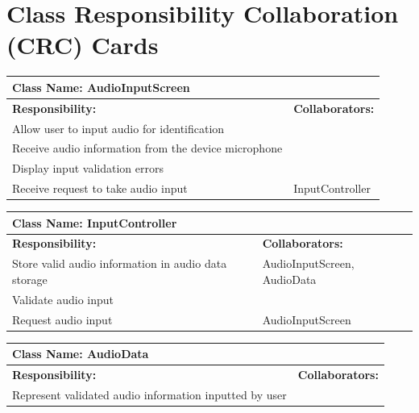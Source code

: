 \documentclass[]{article}
\begin{document}

\newpage	
\section{Class Responsibility Collaboration (CRC) Cards}
\label{sec:class_responsibility_collaboration_crc_cards}

	
	\begin{table}[ht]
		\centering
		\begin{tabular}{|p{5cm}|p{5cm}|}
		\hline 
		 \multicolumn{2}{|l|}{\textbf{Class Name: AudioInputScreen}} \\
		\hline
		\textbf{Responsibility:} & \textbf{Collaborators:} \\
		\hline
		Allow user to input audio for identification &  \\
		\hline
		Receive audio information from the device microphone &  \\
		\hline
		Display input validation errors &  \\
		\hline
		Receive request to take audio input & InputController \\
		\hline
		\end{tabular}
	\end{table}
	
	\begin{table}[ht]
		\centering
		\begin{tabular}{|p{5cm}|p{5cm}|}
		\hline 
		 \multicolumn{2}{|l|}{\textbf{Class Name: InputController}} \\
		\hline
		\textbf{Responsibility:} & \textbf{Collaborators:} \\
		\hline
		Store valid audio information in audio data storage & AudioInputScreen, AudioData \\
		\hline
		Validate audio input &  \\
		\hline
		Request audio input & AudioInputScreen \\
		\hline
		\end{tabular}
	\end{table}
	
	\begin{table}[ht]
		\centering
		\begin{tabular}{|p{5cm}|p{5cm}|}
		\hline 
		 \multicolumn{2}{|l|}{\textbf{Class Name: AudioData}} \\
		\hline
		\textbf{Responsibility:} & \textbf{Collaborators:} \\
		\hline
		Represent validated audio information inputted by user & \\
		\hline
		\end{tabular}
	\end{table}
	
\end{document}
